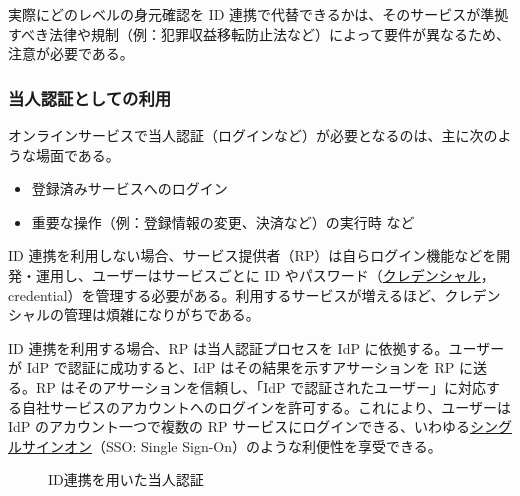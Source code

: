 \documentclass[uplatex]{jsarticle}
\def\label#1{}%
\begin{document}
\begin{rem}[ID連携で代替できる身元確認のレベルは規制による]\label{rem:ch2b-proofing-regulation}
実際にどのレベルの身元確認を ID 連携で代替できるかは、そのサービスが準拠すべき法律や規制（例：犯罪収益移転防止法など）によって要件が異なるため、注意が必要である。
\end{rem}

\subsubsection{当人認証としての利用}

オンラインサービスで当人認証（ログインなど）が必要となるのは、主に次のような場面である。
\begin{itemize}
\item 登録済みサービスへのログイン
\item 重要な操作（例：登録情報の変更、決済など）の実行時 など
\end{itemize}

ID 連携を利用しない場合、サービス提供者（RP）は自らログイン機能などを開発・運用し、ユーザーはサービスごとに ID やパスワード（\underline{クレデンシャル}，credential）を管理する必要がある。利用するサービスが増えるほど、クレデンシャルの管理は煩雑になりがちである。

ID 連携を利用する場合、RP は当人認証プロセスを IdP に依拠する。ユーザーが IdP で認証に成功すると、IdP はその結果を示すアサーションを RP に送る。RP はそのアサーションを信頼し、「IdP で認証されたユーザー」に対応する自社サービスのアカウントへのログインを許可する。これにより、ユーザーは IdP のアカウント一つで複数の RP サービスにログインできる、いわゆる\underline{シングルサインオン}（SSO: Single Sign-On）のような利便性を享受できる。

\begin{figure}[H]
\centering
{}
\caption{ID連携を用いた当人認証}
\label{fig:ch2b-federation-authn}
\end{figure}
\end{document}
